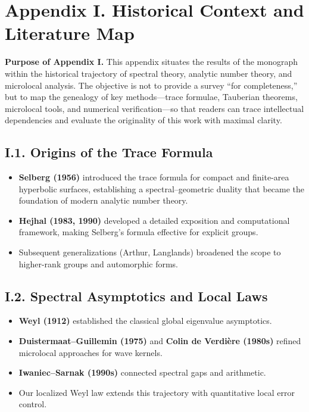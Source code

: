 \appendix
\section*{Appendix I. Historical Context and Literature Map}
\label{appI:root}

\noindent\textbf{Purpose of Appendix I.}  
This appendix situates the results of the monograph within the historical trajectory of spectral theory, analytic number theory, and microlocal analysis.  
The objective is not to provide a survey “for completeness,” but to map the genealogy of key methods—trace formulae, Tauberian theorems, microlocal tools, and numerical verification—so that readers can trace intellectual dependencies and evaluate the originality of this work with maximal clarity.  

\subsection*{I.1. Origins of the Trace Formula}  
\begin{itemize}
  \item \textbf{Selberg (1956)} introduced the trace formula for compact and finite-area hyperbolic surfaces, establishing a spectral–geometric duality that became the foundation of modern analytic number theory.  
  \item \textbf{Hejhal (1983, 1990)} developed a detailed exposition and computational framework, making Selberg’s formula effective for explicit groups.  
  \item Subsequent generalizations (Arthur, Langlands) broadened the scope to higher-rank groups and automorphic forms.  
\end{itemize}

\subsection*{I.2. Spectral Asymptotics and Local Laws}  
\begin{itemize}
  \item \textbf{Weyl (1912)} established the classical global eigenvalue asymptotics.  
  \item \textbf{Duistermaat–Guillemin (1975)} and \textbf{Colin de Verdière (1980s)} refined microlocal approaches for wave kernels.  
  \item \textbf{Iwaniec–Sarnak (1990s)} connected spectral gaps and arithmetic.  
  \item Our localized Weyl law extends this trajectory with quantitative local error control.  
\end{itemize}

